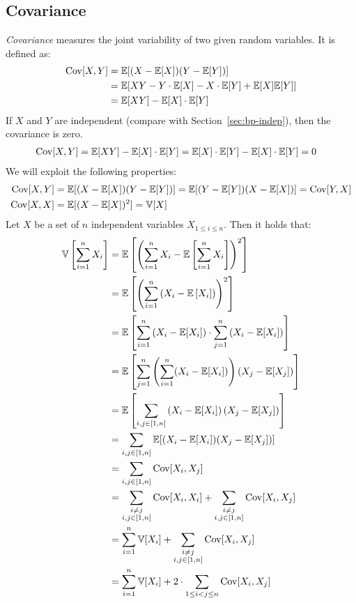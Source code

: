 \subsection{Covariance}
\label{sec:covar}
%
\emph{Covariance} measures the joint variability of two given random variables.
It is defined as:
\begin{align}
  \operatorname{Cov}[X,Y]
    &= \mathbb E[(X - \mathbb E[X])(Y - \mathbb E[Y])] \label{eq:cov}\\
    &= \mathbb E[XY - Y\cdot\mathbb E[X] - X\cdot\mathbb E[Y] + \mathbb E[X]\mathbb E[Y]] \notag\\
    &= \mathbb E[XY] - \mathbb E[X]\cdot\mathbb E[Y] \label{eq:cov-exy}
\end{align}
%
If $X$ and $Y$ are independent (compare with Section~\ref{sec:bp-indep}), then the covariance is zero.
\begin{align}
  \operatorname{Cov}[X,Y] &= \mathbb E[XY] - \mathbb E[X] \cdot \mathbb E[Y] = \mathbb E[X] \cdot \mathbb E[Y] - \mathbb E[X] \cdot \mathbb E[Y] = 0 \label{eq:CovXY0}
\end{align}
We will exploit the following properties:
\begin{align}
  \operatorname{Cov}[X,Y] &= \mathbb E[(X - \mathbb E[X])(Y - \mathbb E[Y])] = \mathbb E[(Y - \mathbb E[Y])(X - \mathbb E[X])] = \operatorname{Cov}[Y,X] \\
  \operatorname{Cov}[X,X] &= \mathbb E[(X - \mathbb E[X])^2] = \mathbb V[X]
\end{align}
%
Let $X$ be a set of $n$ independent variables $X_{1 \leq i \leq n}$.
Then it holds that:
\begin{align}
  \mathbb V\left[\sum_{i=1}^n X_i\right]
    &= \mathbb E\left[\left(\sum_{i=1}^n X_i - \mathbb E\left[\sum_{i=1}^n X_i\right]\right)^2\right] \notag \\
    &= \mathbb E\left[\left(\sum_{i=1}^n \left(X_i - \mathbb E\left[X_i\right]\right)\right)^2\right] \notag \\
    &= \mathbb E\left[\sum_{i=1}^n \left(X_i - \mathbb E[X_i]\right) \cdot \sum_{j=1}^n \left(X_i - \mathbb E[X_i]\right)\right] \notag \\
    &= \mathbb E\left[\sum_{j=1}^n \left(\sum_{i=1}^n (X_i - \mathbb E[X_i])\right) (X_j - \mathbb E[X_j]) \right] \notag \\
    &= \mathbb E\left[\sum_{i,j \in [1,n]} \left(X_i - \mathbb E[X_i]\right) \left(X_j - \mathbb E[X_j]\right)\right] \notag \\
    &= \sum_{i,j \in [1,n]} \mathbb E[(X_i - \mathbb E[X_i])(X_j - \mathbb E[X_j])] \notag \\
    &= \sum_{i,j \in [1,n]} \operatorname{Cov}[X_i, X_j] \notag \\
    &= \sum_{\substack{i \neq j \\ i,j \in [1,n]}} \operatorname{Cov}[X_i, X_i] + \sum_{\substack{i \neq j \\ i,j \in [1,n]}} \operatorname{Cov}[X_i, X_j] \notag \\
    &= \sum_{i=1}^n \mathbb V[X_i] + \sum_{\substack{i \neq j \\ i,j \in [1,n]}} \operatorname{Cov}[X_i, X_j] \notag \\
    &= \sum_{i=1}^n \mathbb V[X_i] + 2 \cdot \sum_{1 \leq i < j \leq n} \operatorname{Cov}[X_i, X_j] \label{eq:sumVarCov}
\end{align}

